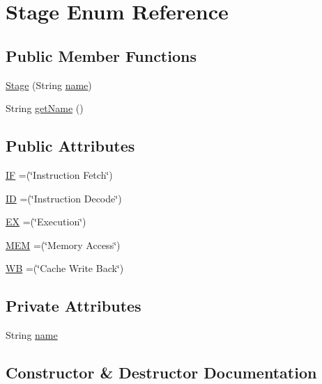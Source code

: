 \hypertarget{enum_stage}{}\section{Stage Enum Reference}
\label{enum_stage}
\subsection*{Public Member Functions}
\begin{DoxyCompactItemize}
\item 
\mbox{\hyperlink{enum_stage_a257d36473edc4c48949d9ad372ac078b}{Stage}} (String \mbox{\hyperlink{enum_stage_af32f9e7d7f90f13fd25b01dccbc49cb0}{name}})
\item 
String \mbox{\hyperlink{enum_stage_aed7fc998a53b35079ed2ff1aef363ec5}{get\+Name}} ()
\end{DoxyCompactItemize}
\subsection*{Public Attributes}
\begin{DoxyCompactItemize}
\item 
\mbox{\hyperlink{enum_stage_aeffba6edad8f19fb7f9a4d8acf9c5a7b}{IF}} =(\char`\"{}Instruction Fetch\char`\"{})
\item 
\mbox{\hyperlink{enum_stage_a90caf5b774c79ea44ca5633fd8206453}{ID}} =(\char`\"{}Instruction Decode\char`\"{})
\item 
\mbox{\hyperlink{enum_stage_aeda45a1236f43fc0e106bb52ea327611}{EX}} =(\char`\"{}Execution\char`\"{})
\item 
\mbox{\hyperlink{enum_stage_a9f5ca32ff09a37d81d80d1298350a57d}{M\+EM}} =(\char`\"{}Memory Access\char`\"{})
\item 
\mbox{\hyperlink{enum_stage_af6726871c185b151ca9747f844e71b9c}{WB}} =(\char`\"{}Cache Write Back\char`\"{})
\end{DoxyCompactItemize}
\subsection*{Private Attributes}
\begin{DoxyCompactItemize}
\item 
String \mbox{\hyperlink{enum_stage_af32f9e7d7f90f13fd25b01dccbc49cb0}{name}}
\end{DoxyCompactItemize}


\subsection{Constructor \& Destructor Documentation}
\mbox{\label{enum_stage_a257d36473edc4c48949d9ad372ac078b}} 
